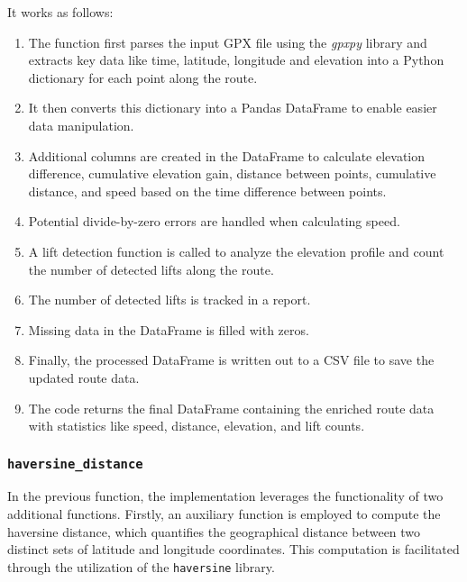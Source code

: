 It works as follows:
\begin{enumerate}
    \item The function first parses the input GPX file using the \textit{gpxpy} library and extracts key data like time, latitude, longitude and elevation into a Python dictionary for each point along the route.
    
    \item It then converts this dictionary into a Pandas DataFrame to enable easier data manipulation.
    
    \item Additional columns are created in the DataFrame to calculate elevation difference, cumulative elevation gain, distance between points, cumulative distance, and speed based on the time difference between points.
    
    \item Potential divide-by-zero errors are handled when calculating speed.
    
    \item A lift detection function is called to analyze the elevation profile and count the number of detected lifts along the route.
    
    \item The number of detected lifts is tracked in a report.
    
    \item Missing data in the DataFrame is filled with zeros.
    
    \item Finally, the processed DataFrame is written out to a CSV file to save the updated route data.
    
    \item The code returns the final DataFrame containing the enriched route data with statistics like speed, distance, elevation, and lift counts.
\end{enumerate}


\subsubsection{\texttt{haversine\_distance}}

In the previous function, the implementation leverages the functionality of two additional functions. Firstly, an auxiliary function is employed to compute the haversine distance, which quantifies the geographical distance between two distinct sets of latitude and longitude coordinates. This computation is facilitated through the utilization of the \texttt{haversine} library. 

